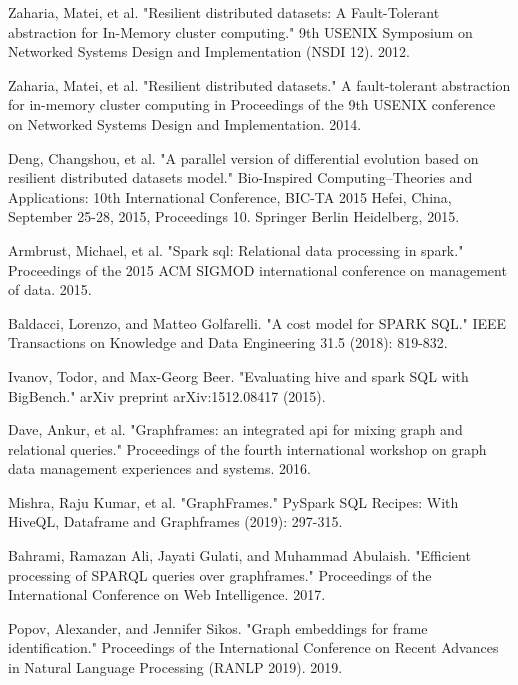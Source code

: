 \begin{thebibliography}{99\kern\bibindent}
	 Zaharia, Matei, et al. "Resilient distributed datasets: A {Fault-Tolerant} abstraction for {In-Memory} cluster computing." 9th USENIX Symposium on Networked Systems Design and Implementation (NSDI 12). 2012.
	
	 Zaharia, Matei, et al. "Resilient distributed datasets." A fault-tolerant abstraction for in-memory cluster computing in Proceedings of the 9th USENIX conference on Networked Systems Design and Implementation. 2014.
	
	 Deng, Changshou, et al. "A parallel version of differential evolution based on resilient distributed datasets model." Bio-Inspired Computing--Theories and Applications: 10th International Conference, BIC-TA 2015 Hefei, China, September 25-28, 2015, Proceedings 10. Springer Berlin Heidelberg, 2015.
	
	 Armbrust, Michael, et al. "Spark sql: Relational data processing in spark." Proceedings of the 2015 ACM SIGMOD international conference on management of data. 2015.
	
	 Baldacci, Lorenzo, and Matteo Golfarelli. "A cost model for SPARK SQL." IEEE Transactions on Knowledge and Data Engineering 31.5 (2018): 819-832.
	
	 Ivanov, Todor, and Max-Georg Beer. "Evaluating hive and spark SQL with BigBench." arXiv preprint arXiv:1512.08417 (2015).
	
	 Dave, Ankur, et al. "Graphframes: an integrated api for mixing graph and relational queries." Proceedings of the fourth international workshop on graph data management experiences and systems. 2016.
	
	 Mishra, Raju Kumar, et al. "GraphFrames." PySpark SQL Recipes: With HiveQL, Dataframe and Graphframes (2019): 297-315.
	
	 Bahrami, Ramazan Ali, Jayati Gulati, and Muhammad Abulaish. "Efficient processing of SPARQL queries over graphframes." Proceedings of the International Conference on Web Intelligence. 2017.
	
	 Popov, Alexander, and Jennifer Sikos. "Graph embeddings for frame identification." Proceedings of the International Conference on Recent Advances in Natural Language Processing (RANLP 2019). 2019.
	
\end{thebibliography}